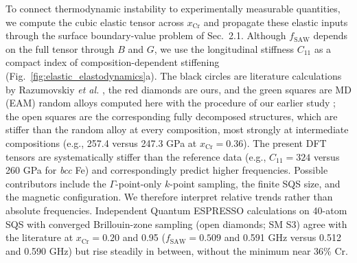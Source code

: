 \documentclass[final,3p,times]{elsarticle}
\begin{document}
To connect thermodynamic instability to experimentally measurable quantities, we compute the cubic elastic tensor across $x_{\mathrm{Cr}}$ and propagate these elastic inputs through the surface boundary-value problem of Sec.~2.1. Although $f_{\mathrm{SAW}}$ depends on the full tensor through $B$ and $G$, we use the longitudinal stiffness $C_{11}$ as a compact index of composition-dependent stiffening (Fig.~\ref{fig:elastic_elastodynamics}a). The black circles are literature calculations by Razumovskiy \textit{et al.} \cite{razumovskiy2011first}, the red diamonds are ours, and the green squares are MD (EAM) random alloys computed here with the procedure of our earlier study \cite{al2023detecting}; the open squares are the corresponding fully decomposed structures, which are stiffer than the random alloy at every composition, most strongly at intermediate compositions (e.g., 257.4 versus 247.3 GPa at $x_{\mathrm{Cr}}=0.36$). The present DFT tensors are systematically stiffer than the reference data (e.g., $C_{11}=324$ versus 260 GPa for \textit{bcc} Fe) and correspondingly predict higher frequencies. Possible contributors include the $\Gamma$-point-only $k$-point sampling, the finite SQS size, and the magnetic configuration. We therefore interpret relative trends rather than absolute frequencies. Independent Quantum ESPRESSO calculations on 40-atom SQS with converged Brillouin-zone sampling (open diamonds; SM S3) agree with the literature at $x_{\mathrm{Cr}}=0.20$ and 0.95 ($f_{\mathrm{SAW}}=0.509$ and 0.591 GHz versus 0.512 and 0.590 GHz) but rise steadily in between, without the minimum near 36\% Cr.
\end{document}
